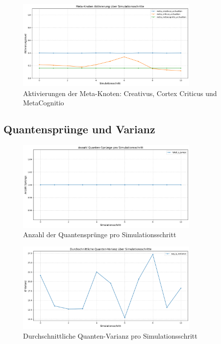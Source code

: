 \documentclass[11pt,a4paper]{article}
\begin{document}
\begin{figure}[H]
    \centering
    \includegraphics[width=0.8\textwidth]{meta_nodes_activation_timeseries.png}
    \caption{Aktivierungen der Meta-Knoten: Creativus, Cortex Criticus und MetaCognitio}
    \label{fig:meta_nodes}
\end{figure}

\subsection{Quantensprünge und Varianz}

\begin{figure}[H]
    \centering
    \includegraphics[width=0.8\textwidth]{q_jumps_timeseries.png}
    \caption{Anzahl der Quantensprünge pro Simulationsschritt}
    \label{fig:q_jumps}
\end{figure}

\begin{figure}[H]
    \centering
    \includegraphics[width=0.8\textwidth]{q_variance_timeseries.png}
    \caption{Durchschnittliche Quanten-Varianz pro Simulationsschritt}
    \label{fig:q_variance}
\end{figure}
\end{document}
